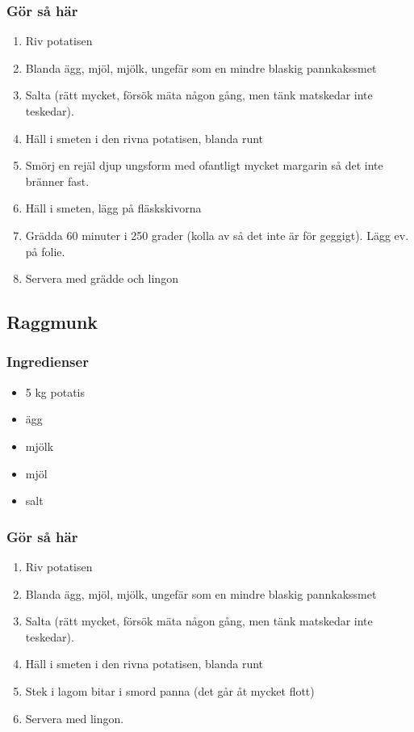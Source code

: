 \documentclass[a4paper,11pt,twocolumn]{article}
\begin{document}
\subsubsection*{Gör så här}
\begin{enumerate}[label=\arabic*.]
    \item Riv potatisen
    \item Blanda ägg, mjöl, mjölk, ungefär som en mindre blaskig pannkakssmet
    \item Salta (rätt mycket, försök mäta någon gång, men tänk matskedar inte teskedar).
    \item Häll i smeten i den rivna potatisen, blanda runt
    \item Smörj en rejäl djup ungsform med ofantligt mycket margarin så det inte bränner fast.
    \item Häll i smeten, lägg på fläskskivorna
    \item Grädda 60 minuter i 250 grader (kolla av så det inte är för geggigt). Lägg ev. på folie.
    \item Servera med grädde och lingon
\end{enumerate}




\subsection{Raggmunk}
\subsubsection*{Ingredienser}
\begin{itemize}[noitemsep]
    \item 5 kg potatis
    \item ägg
    \item mjölk
    \item mjöl
    \item salt
\end{itemize}
\subsubsection*{Gör så här}
\begin{enumerate}[label=\arabic*.]
    \item Riv potatisen
    \item Blanda ägg, mjöl, mjölk, ungefär som en mindre blaskig pannkakssmet
    \item Salta (rätt mycket, försök mäta någon gång, men tänk matskedar inte teskedar).
    \item Häll i smeten i den rivna potatisen, blanda runt
    \item Stek i lagom bitar i smord panna (det går åt mycket flott)
    \item Servera med lingon.
\end{enumerate}
\end{document}
